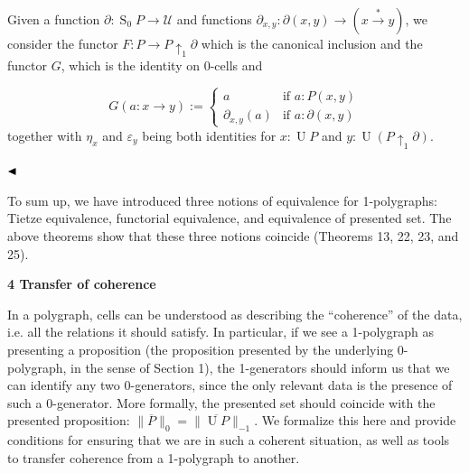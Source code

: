 Given a function $\partial:\operatorname{S}_{0}P\to\mathcal{U}$ and functions $\partial_{x,y}:\partial(x,y)\to(x\overset{*}{\to}y)$, we consider the functor $F:P\to P{\uparrow_{1}}\partial$ which is the canonical inclusion and the functor $G$, which is the identity on 0-cells and\par
    \[G(a:x\to y):=\begin{cases}a&\text{if $a:P(x,y)$}\\
\partial_{x,y}(a)&\text{if $a:\partial(x,y)$}\end{cases}\]    
together with $\eta_{x}$ and $\varepsilon_{y}$ being both identities for $x:\operatorname{U}P$ and $y:\operatorname{U}(P{\uparrow_{1}}\partial)$.\par
 
   
$\hfill\blacktriangleleft$\par
 
 
 
To sum up, we have introduced three notions of equivalence for 1-polygraphs: Tietze equivalence, functorial equivalence, and equivalence of presented set. The above theorems show that these three notions coincide (Theorems 13, 22, 23, and 25).\par
 
 
 
 


 
\par\medskip\noindent\textbf{4 Transfer of coherence}\par
 
 
In a polygraph, cells can be understood as describing the “coherence” of the data, i.e. all the relations it should satisfy. In particular, if we see a 1-polygraph as presenting a proposition (the proposition presented by the underlying 0-polygraph, in the sense of Section 1), the 1-generators should inform us that we can identify any two 0-generators, since the only relevant data is the presence of such a 0-generator. More formally, the presented set should coincide with the presented proposition: $\|\overline{P}\|_{0}=\|\overline{\operatorname{U}P}\|_{-1}$. We formalize this here and provide conditions for ensuring that we are in such a coherent situation, as well as tools to transfer coherence from a 1-polygraph to another.\par
 
